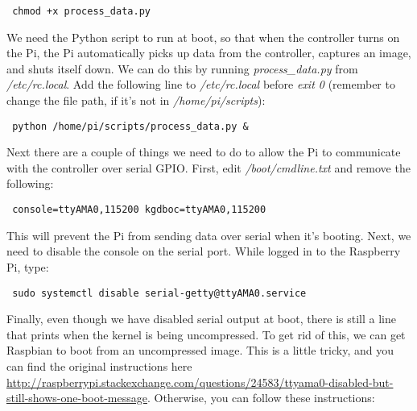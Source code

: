 \documentclass[10pt]{article}
\begin{document}
\begin{verbatim}
 chmod +x process_data.py
\end{verbatim}

We need the Python script to run at boot, so that when the controller turns on the Pi, the Pi automatically picks up data from the controller, captures an
image, and shuts itself down. We can do this by running \textit{process\_data.py} from \textit{/etc/rc.local}. Add the following line to \textit{/etc/rc.local} before
\textit{exit 0} (remember to change the file path, if it's not in \textit{/home/pi/scripts}):

\begin{verbatim}
 python /home/pi/scripts/process_data.py &
\end{verbatim}

Next there are a couple of things we need to do to allow the Pi to communicate with the controller over serial GPIO. First, edit \textit{/boot/cmdline.txt} and remove
the following:

\begin{verbatim}
 console=ttyAMA0,115200 kgdboc=ttyAMA0,115200
\end{verbatim}

This will prevent the Pi from sending data over serial when it's booting. Next, we need to disable the console on the serial port. While logged in to the Raspberry Pi,
type:

\begin{verbatim}
 sudo systemctl disable serial-getty@ttyAMA0.service
\end{verbatim}

Finally, even though we have disabled serial output at boot, there is still a line that prints when the kernel is being uncompressed. To get rid of this, we can 
get Raspbian to boot from an uncompressed image. This is a little tricky, and you can find the original instructions here 
\url{http://raspberrypi.stackexchange.com/questions/24583/ttyama0-disabled-but-still-shows-one-boot-message}. Otherwise, you can follow these instructions:
\end{document}
